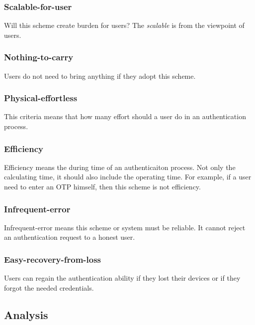 \begin{CJK}{Bg5}{bsmi}
\subsubsection{Scalable-for-user}

Will this scheme create burden for users? The \emph{scalable} is from the viewpoint of users.

\subsubsection{Nothing-to-carry}

Users do not need to bring anything if they adopt this scheme.

\subsubsection{Physical-effortless}

This criteria means that how many effort should a user do in an authentication process.

\subsubsection{Efficiency}

Efficiency means the during time of an authenticaiton process. Not only the calculating time, it should also include the operating time. For example, if a user need to enter an OTP himself, then this scheme is not efficiency.

\subsubsection{Infrequent-error}

Infrequent-error means this scheme or system must be reliable. It cannot reject an authentication request to a honest user.

\subsubsection{Easy-recovery-from-loss}

Users can regain the authentication ability if they lost their devices or if they forgot the needed credentials.

\subsection{Analysis}

\end{CJK}
